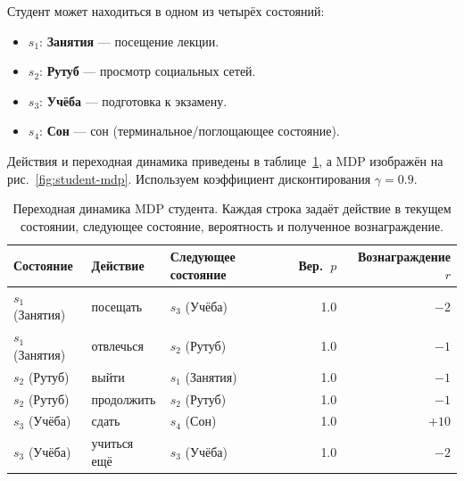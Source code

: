 \begin{example}
\label{ex:student-mdp}
Студент может находиться в одном из четырёх состояний:
\begin{itemize}[leftmargin=*]
  \item $s_1$: \textbf{Занятия} — посещение лекции.
  \item $s_2$: \textbf{Рутуб} — просмотр социальных сетей.
  \item $s_3$: \textbf{Учёба} — подготовка к экзамену.
  \item $s_4$: \textbf{Сон} — сон (терминальное/поглощающее состояние).
\end{itemize}
Действия и переходная динамика приведены в таблице~\ref{tab:student-mdp}, а MDP изображён на рис.~\ref{fig:student-mdp}. Используем коэффициент дисконтирования $\gamma = 0.9$.

\begin{table}[ht]
\centering
\caption{Переходная динамика MDP студента. Каждая строка задаёт действие в текущем состоянии, следующее состояние, вероятность и полученное вознаграждение.}
\label{tab:student-mdp}
\begin{tabular}{lllrr}
\toprule
Состояние & Действие & Следующее состояние & Вер.\ $p$ & Вознаграждение $r$ \\
\midrule
$s_1$ (Занятия) & посещать & $s_3$ (Учёба) & 1.0 & $-2$ \\
$s_1$ (Занятия) & отвлечься & $s_2$ (Рутуб) & 1.0 & $-1$ \\
$s_2$ (Рутуб) & выйти & $s_1$ (Занятия) & 1.0 & $-1$ \\
$s_2$ (Рутуб) & продолжить & $s_2$ (Рутуб) & 1.0 & $-1$ \\
$s_3$ (Учёба) & сдать & $s_4$ (Сон) & 1.0 & $+10$ \\
$s_3$ (Учёба) & учиться ещё & $s_3$ (Учёба) & 1.0 & $-2$ \\
\bottomrule
\end{tabular}
\end{table}

\begin{figure}[ht]
\centering
{}
\end{figure}
\end{example}
